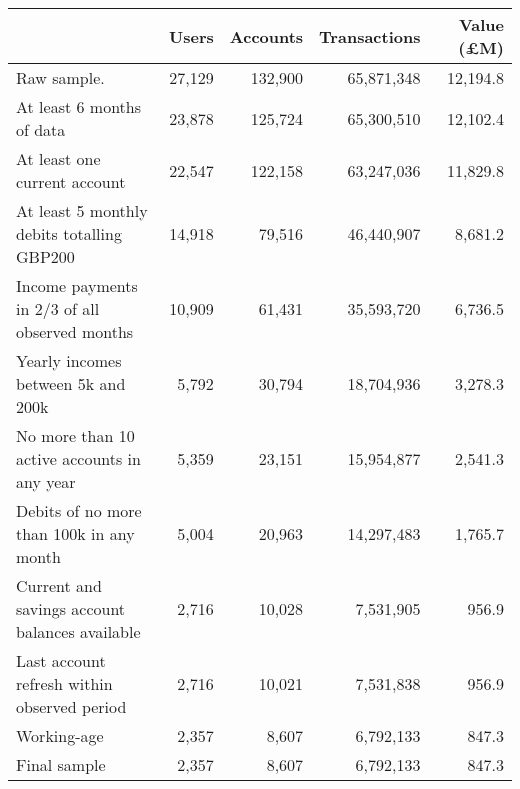 \begin{tabular}{lrrrr}
\toprule
                                               &  Users & Accounts & Transactions & Value (\pounds M) \\
\midrule
                                   Raw sample. & 27,129 &  132,900 &   65,871,348 &          12,194.8 \\
                     At least 6 months of data & 23,878 &  125,724 &   65,300,510 &          12,102.4 \\
                  At least one current account & 22,547 &  122,158 &   63,247,036 &          11,829.8 \\
    At least 5 monthly debits totalling GBP200 & 14,918 &   79,516 &   46,440,907 &           8,681.2 \\
 Income payments in 2/3 of all observed months & 10,909 &   61,431 &   35,593,720 &           6,736.5 \\
            Yearly incomes between 5k and 200k &  5,792 &   30,794 &   18,704,936 &           3,278.3 \\
   No more than 10 active accounts in any year &  5,359 &   23,151 &   15,954,877 &           2,541.3 \\
      Debits of no more than 100k in any month &  5,004 &   20,963 &   14,297,483 &           1,765.7 \\
Current and savings account balances available &  2,716 &   10,028 &    7,531,905 &             956.9 \\
   Last account refresh within observed period &  2,716 &   10,021 &    7,531,838 &             956.9 \\
                                   Working-age &  2,357 &    8,607 &    6,792,133 &             847.3 \\
                                  Final sample &  2,357 &    8,607 &    6,792,133 &             847.3 \\
\bottomrule
\end{tabular}
